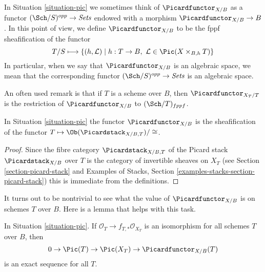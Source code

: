 \noindent
In Situation \ref{situation-pic} we sometimes think of
$\Picardfunctor_{X/B}$ as a functor $(\Sch/S)^{opp} \to \textit{Sets}$
endowed with a morphism $\Picardfunctor_{X/B} \to B$. In this point
of view, we define $\Picardfunctor_{X/B}$ to be the fppf sheafification of
the functor
$$
T/S \longmapsto \{(h, \mathcal{L}) \mid
h : T \to B,\ \mathcal{L} \in \Pic(X \times_{B, h} T)\}
$$
In particular, when we say that $\Picardfunctor_{X/B}$ is an algebraic space,
we mean that the corresponding functor
$(\Sch/S)^{opp} \to \textit{Sets}$ is an algebraic space.

\medskip\noindent
An often used remark is that if $T$ is a scheme over $B$, then
$\Picardfunctor_{X_T/T}$ is the restriction of $\Picardfunctor_{X/B}$ to
$(\Sch/T)_{fppf}$.

\begin{lemma}
\label{lemma-pic-over-pic}
In Situation \ref{situation-pic}
the functor $\Picardfunctor_{X/B}$ is the sheafification of
the functor $T \mapsto \Ob(\Picardstack_{X/B, T})/\cong$.
\end{lemma}

\begin{proof}
Since the fibre category $\Picardstack_{X/B, T}$ of the Picard stack
$\Picardstack_{X/B}$ over $T$ is the category of invertible sheaves on
$X_T$ (see Section \ref{section-picard-stack} and
Examples of Stacks, Section \ref{examples-stacks-section-picard-stack})
this is immediate from the definitions.
\end{proof}

\noindent
It turns out to be nontrivial to see what the value of $\Picardfunctor_{X/B}$
is on schemes $T$ over $B$. Here is a lemma that helps with this task.

\begin{lemma}
\label{lemma-flat-geometrically-connected-fibres}
In Situation \ref{situation-pic}.
If $\mathcal{O}_T \to f_{T, *}\mathcal{O}_{X_T}$ is an isomorphism
for all schemes $T$ over $B$, then
$$
0 \to \Pic(T) \to \Pic(X_T) \to \Picardfunctor_{X/B}(T)
$$
is an exact sequence for all $T$.
\end{lemma}

